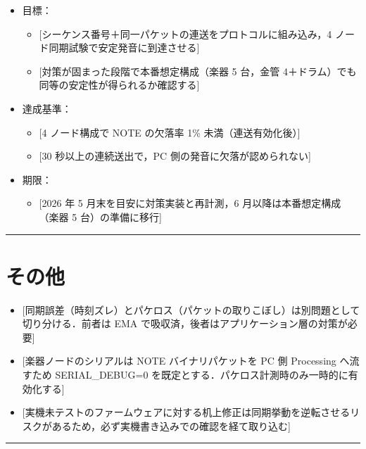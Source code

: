 \documentclass[uplatex,dvipdfmx,a4paper,11pt]{jsarticle}
\newcommand{\sectionrule}{\par\medskip\noindent\rule{\linewidth}{0.6pt}\par\medskip}
\begin{document}
\begin{itemize}
  \item 目標：
    \begin{itemize}
      \item {}[シーケンス番号＋同一パケットの連送をプロトコルに組み込み，4 ノード同期試験で安定発音に到達させる]
      \item {}[対策が固まった段階で本番想定構成（楽器 5 台，金管 4＋ドラム）でも同等の安定性が得られるか確認する]
    \end{itemize}
  \item 達成基準：
    \begin{itemize}
      \item {}[4 ノード構成で NOTE の欠落率 1\% 未満（連送有効化後）]
      \item {}[30 秒以上の連続送出で，PC 側の発音に欠落が認められない]
    \end{itemize}
  \item 期限：
    \begin{itemize}
      \item {}[2026 年 5 月末を目安に対策実装と再計測，6 月以降は本番想定構成（楽器 5 台）の準備に移行]
    \end{itemize}
\end{itemize}

\sectionrule

\section{その他}

\begin{itemize}
  \item {}[同期誤差（時刻ズレ）とパケロス（パケットの取りこぼし）は別問題として切り分ける．前者は EMA で吸収済，後者はアプリケーション層の対策が必要]
  \item {}[楽器ノードのシリアルは NOTE バイナリパケットを PC 側 Processing へ流すため SERIAL\_DEBUG=0 を既定とする．パケロス計測時のみ一時的に有効化する]
  \item {}[実機未テストのファームウェアに対する机上修正は同期挙動を逆転させるリスクがあるため，必ず実機書き込みでの確認を経て取り込む]
\end{itemize}

\sectionrule

\end{document}
